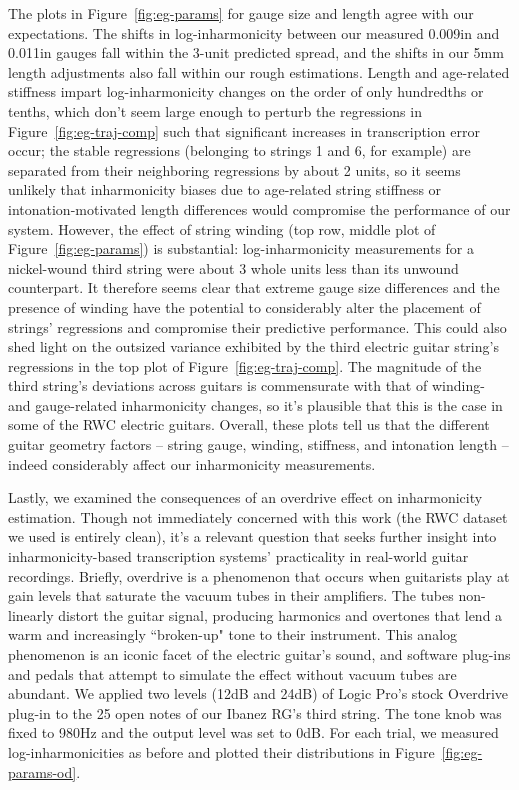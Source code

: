 \documentclass[12pt]{cmuthesis}
\begin{document}
The plots in Figure~\ref{fig:eg-params} for gauge size and length agree with our expectations. The shifts in log-inharmonicity between our measured 0.009in and 0.011in gauges fall within the 3-unit predicted spread, and the shifts in our 5mm length adjustments also fall within our rough estimations. Length and age-related stiffness impart log-inharmonicity changes on the order of only hundredths or tenths, which don't seem large enough to perturb the regressions in Figure~\ref{fig:eg-traj-comp} such that significant increases in transcription error occur; the stable regressions (belonging to strings 1 and 6, for example) are separated from their neighboring regressions by about 2 units, so it seems unlikely that inharmonicity biases due to age-related string stiffness or intonation-motivated length differences would compromise the performance of our system. However, the effect of string winding (top row, middle plot of Figure~\ref{fig:eg-params}) is substantial: log-inharmonicity measurements for a nickel-wound third string were about 3 whole units less than its unwound counterpart. It therefore seems clear that extreme gauge size differences and the presence of winding have the potential to considerably alter the placement of strings' regressions and compromise their predictive performance. This could also shed light on the outsized variance exhibited by the third electric guitar string's regressions in the top plot of Figure~\ref{fig:eg-traj-comp}. The magnitude of the third string's deviations across guitars is commensurate with that of winding- and gauge-related inharmonicity changes, so it's plausible that this is the case in some of the RWC electric guitars. Overall, these plots tell us that the different guitar geometry factors -- string gauge, winding, stiffness, and intonation length -- indeed considerably affect our inharmonicity measurements.

Lastly, we examined the consequences of an overdrive effect on inharmonicity estimation. Though not immediately concerned with this work (the RWC dataset we used is entirely clean), it's a relevant question that seeks further insight into inharmonicity-based transcription systems' practicality in real-world guitar recordings. Briefly, overdrive is a phenomenon that occurs when guitarists play at gain levels that saturate the vacuum tubes in their amplifiers. The tubes non-linearly distort the guitar signal, producing harmonics and overtones that lend a warm and increasingly ``broken-up" tone to their instrument. This analog phenomenon is an iconic facet of the electric guitar's sound, and software plug-ins and pedals that attempt to simulate the effect without vacuum tubes are abundant. We applied two levels (12dB and 24dB) of Logic Pro's stock Overdrive plug-in to the 25 open notes of our Ibanez RG's third string. The tone knob was fixed to 980Hz and the output level was set to 0dB. For each trial, we measured log-inharmonicities as before and plotted their distributions in Figure~\ref{fig:eg-params-od}.
\end{document}
